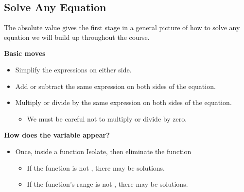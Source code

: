 \subsection{Solve Any Equation} 
The absolute value gives the first stage in a general picture of how to solve any equation we will build up throughout the course.
\begin{fact}
\textbf{Basic moves}
\begin{itemize}
\item Simplify the expressions on either side.
\item Add or subtract the same expression on both sides of the equation.
\item Multiply or divide by the same expression on both sides of the equation.
\begin{itemize}
\item We must be careful not to multiply or divide by zero.
\end{itemize}
\end{itemize}
\textbf{How does the variable appear?}
\begin{itemize}
\item Once, inside a function {\textrightarrow} Isolate, then eliminate the function
\begin{itemize}
\item If the function is not \makeblank[1in], there may be \makeblank[1in] solutions.
\item If the function's range is not \makeblank, there may be \makeblanksmall solutions.
\end{itemize}
\end{itemize}
\end{fact}
